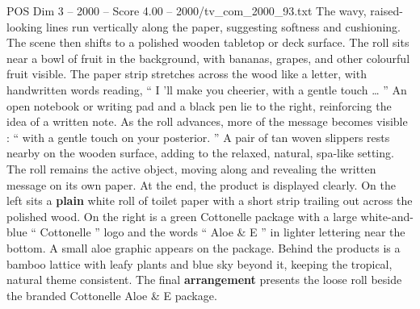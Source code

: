 \begin{textsample}{POS Dim 3 – 2000 – Score 4.00 – 2000/tv\_com\_2000\_93.txt}
The wavy, raised-looking lines run vertically along the paper, suggesting softness and cushioning.
The scene then shifts to a polished wooden tabletop or deck surface.
The roll sits near a bowl of fruit in the background, with bananas, grapes, and other colourful fruit visible.
The paper strip stretches across the wood like a letter, with handwritten words reading, “ I ’ll make you cheerier, with a gentle touch … ” An open notebook or writing pad and a black pen lie to the right, reinforcing the idea of a written note.
As the roll advances, more of the message becomes visible : “ with a gentle touch on your posterior. ” A pair of tan woven slippers rests nearby on the wooden surface, adding to the relaxed, natural, spa-like setting.
The roll remains the active object, moving along and revealing the written message on its own paper.
At the end, the product is displayed clearly.
On the left sits a \textbf{plain} white roll of toilet paper with a short strip trailing out across the polished wood.
On the right is a green Cottonelle package with a large white-and-blue “ Cottonelle ” logo and the words “ Aloe \& E ” in lighter lettering near the bottom.
A small aloe graphic appears on the package.
Behind the products is a bamboo lattice with leafy plants and blue sky beyond it, keeping the tropical, natural theme consistent.
The final \textbf{arrangement} presents the loose roll beside the branded Cottonelle Aloe \& E package.

\end{textsample}
